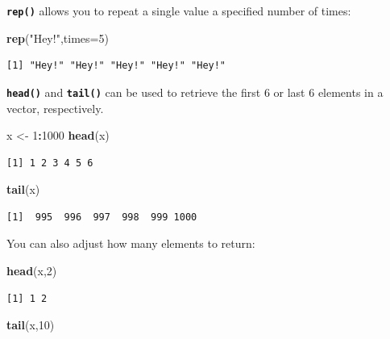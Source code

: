 \documentclass[
]{book}
\newenvironment{Shaded}{\begin{snugshade}}{\end{snugshade}}
\newcommand{\DataTypeTok}[1]{\textcolor[rgb]{0.13,0.29,0.53}{#1}}
\newcommand{\DecValTok}[1]{\textcolor[rgb]{0.00,0.00,0.81}{#1}}
\newcommand{\KeywordTok}[1]{\textcolor[rgb]{0.13,0.29,0.53}{\textbf{#1}}}
\newcommand{\NormalTok}[1]{#1}
\newcommand{\OperatorTok}[1]{\textcolor[rgb]{0.81,0.36,0.00}{\textbf{#1}}}
\newcommand{\StringTok}[1]{\textcolor[rgb]{0.31,0.60,0.02}{#1}}
\begin{document}
\textbf{\texttt{rep()}} allows you to repeat a single value a specified number of times:

\begin{Shaded}
\begin{Highlighting}[]
\KeywordTok{rep}\NormalTok{(}\StringTok{"Hey!"}\NormalTok{,}\DataTypeTok{times=}\DecValTok{5}\NormalTok{)}
\end{Highlighting}
\end{Shaded}

\begin{verbatim}
[1] "Hey!" "Hey!" "Hey!" "Hey!" "Hey!"
\end{verbatim}

\textbf{\texttt{head()}} and \textbf{\texttt{tail()}} can be used to retrieve the first 6 or last 6 elements in a vector, respectively.

\begin{Shaded}
\begin{Highlighting}[]
\NormalTok{x <-}\StringTok{ }\DecValTok{1}\OperatorTok{:}\DecValTok{1000}
\KeywordTok{head}\NormalTok{(x)}
\end{Highlighting}
\end{Shaded}

\begin{verbatim}
[1] 1 2 3 4 5 6
\end{verbatim}

\begin{Shaded}
\begin{Highlighting}[]
\KeywordTok{tail}\NormalTok{(x)}
\end{Highlighting}
\end{Shaded}

\begin{verbatim}
[1]  995  996  997  998  999 1000
\end{verbatim}

You can also adjust how many elements to return:

\begin{Shaded}
\begin{Highlighting}[]
\KeywordTok{head}\NormalTok{(x,}\DecValTok{2}\NormalTok{)}
\end{Highlighting}
\end{Shaded}

\begin{verbatim}
[1] 1 2
\end{verbatim}

\begin{Shaded}
\begin{Highlighting}[]
\KeywordTok{tail}\NormalTok{(x,}\DecValTok{10}\NormalTok{)}
\end{Highlighting}
\end{Shaded}
\end{document}
